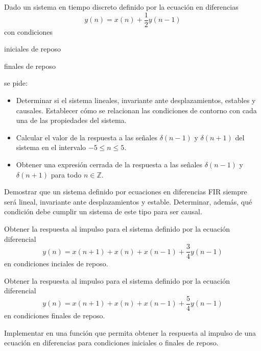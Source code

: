 \begin{ejercicio}

    Dado un sistema en tiempo discreto definido por la ecuación en diferencias 
    \begin{equation*}
        y(n) = x(n) + \frac{1}{2} y(n-1)
    \end{equation*}
    con condiciones
    
    \inciso iniciales de reposo

    \inciso finales de reposo

    \noindent se pide:
    \begin{itemize}
        \item Determinar si el sistema lineales, invariante ante desplazamientos, estables y causales. Establecer cómo se relacionan las condiciones de contorno con cada una de las propiedades del sistema.
        \item Calcular el valor de la respuesta a las señales $\delta(n-1)$ y $\delta(n+1)$ del sistema en el intervalo $-5 \leq n \leq 5$.
        \item Obtener una expresión cerrada de la respuesta a las señales $\delta(n-1)$ y $\delta(n+1)$ para todo $n \in \mathbb{Z}$.
    \end{itemize}
\end{ejercicio}
    
\begin{ejercicio}
    Demostrar que un sistema definido por ecuaciones en diferencias FIR siempre será lineal, invariante ante desplazamientos y estable. Determinar, además, qué condición debe cumplir un sistema de este tipo para ser causal.
\end{ejercicio}
    
\begin{ejercicio}
    Obtener la respuesta al impulso para el sistema definido por la ecuación diferencial 
    \begin{equation*}
        y(n) = x(n+1) + x(n) + x(n-1) + \frac{3}{4} y(n-1)
    \end{equation*}
    en condiciones inciales de reposo. 
\end{ejercicio}
    
\begin{ejercicio}
    Obtener la respuesta al impulso para el sistema definido por la ecuación diferencial 
    \begin{equation*}
        y(n) = x(n+1) + x(n) + x(n-1) + \frac{5}{4} y(n-1)
    \end{equation*}
    en condiciones finales de reposo. 
\end{ejercicio}
    
\begin{ejercicio}
    Implementar en \Keyboardsym una función que permita obtener la respuesta al impulso de una ecuación en diferencias para condiciones iniciales o finales de reposo.
\end{ejercicio}
    
    
    